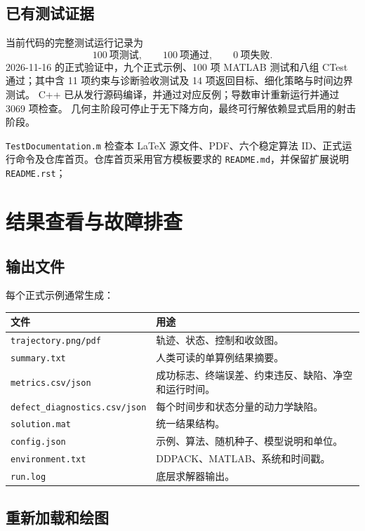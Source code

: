 \documentclass[UTF8,zihao=-4,openany,fontset=fandol]{ctexbook}
\newcommand{\code}[1]{\nolinkurl{#1}}
\begin{document}
\section{已有测试证据}

当前代码的完整测试运行记录为
\[
  100\ \text{项测试},\qquad
  100\ \text{项通过},\qquad
  0\ \text{项失败}.
\]
2026-11-16 的正式验证中，九个正式示例、100 项 MATLAB 测试和八组 CTest 通过；其中含 11 项约束与诊断验收测试及 14 项返回目标、细化策略与时间边界测试。
C++ 已从发行源码编译，并通过对应反例；导数审计重新运行并通过 3069 项检查。
几何主阶段可停止于无下降方向，最终可行解依赖显式启用的射击阶段。

\code{TestDocumentation.m} 检查本 LaTeX 源文件、PDF、六个稳定算法 ID、正式运行命令及仓库首页。仓库首页采用官方模板要求的 \code{README.md}，并保留扩展说明 \code{README.rst}；

\chapter{结果查看与故障排查}

\section{输出文件}

每个正式示例通常生成：

\begin{longtable}{p{}p{}}
\toprule
文件 & 用途\\
\midrule
\endhead
\code{trajectory.png/pdf} & 轨迹、状态、控制和收敛图。\\
\code{summary.txt} & 人类可读的单算例结果摘要。\\
\code{metrics.csv/json} & 成功标志、终端误差、约束违反、缺陷、净空和运行时间。\\
\code{defect_diagnostics.csv/json} & 每个时间步和状态分量的动力学缺陷。\\
\code{solution.mat} & 统一结果结构。\\
\code{config.json} & 示例、算法、随机种子、模型说明和单位。\\
\code{environment.txt} & DDPACK、MATLAB、系统和时间戳。\\
\code{run.log} & 底层求解器输出。\\
\bottomrule
\end{longtable}

\section{重新加载和绘图}
\end{document}
